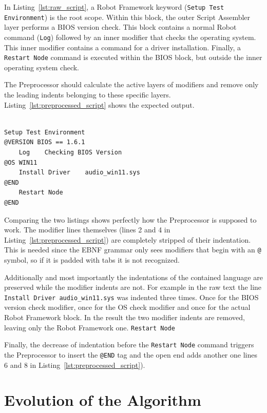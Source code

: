 In Listing~\ref{lst:raw_script}, a Robot Framework keyword (\texttt{Setup Test Environment}) is the root scope. Within this block, the outer Script Assembler layer performs a BIOS version check. This block contains a normal Robot command (\texttt{Log}) followed by an inner modifier that checks the operating system. This inner modifier contains a command for a driver installation. Finally, a \texttt{Restart Node} command is executed within the BIOS block, but outside the inner operating system check.


The Preprocessor should calculate the active layers of modifiers and remove only the leading indents belonging to these specific layers. Listing~\ref{lst:preprocessed_script} shows the expected output.


\begin{lstlisting}[caption={Expected Preprocessor output}, label={lst:preprocessed_script}, float=htbp]

Setup Test Environment
@VERSION BIOS == 1.6.1
    Log    Checking BIOS Version
@OS WIN11
    Install Driver    audio_win11.sys
@END
    Restart Node
@END

\end{lstlisting}


Comparing the two listings shows perfectly how the Preprocessor is supposed to work. The modifier lines themselves (lines 2 and 4 in Listing~\ref{lst:preprocessed_script}) are completely stripped of their indentation. This is needed since the EBNF grammar only sees modifiers that begin with an \texttt{@} symbol, so if it is padded with tabs it is not recognized.

Additionally and most importantly the indentations of the contained language are preserved while the modifier indents are not. For example in the raw text the line \texttt{Install Driver    audio\_win11.sys} was indented three times. Once for the BIOS version check modifier, once for the OS check modifier and once for the actual Robot Framework block. In the result the two modifier indents are removed, leaving only the Robot Framework one.
\texttt{Restart Node}

Finally, the decrease of indentation before the \texttt{Restart Node} command triggers the Preprocessor to insert the \texttt{@END} tag and the open end adds another one lines 6 and 8 in Listing~\ref{lst:preprocessed_script}).


\section{Evolution of the Algorithm}


